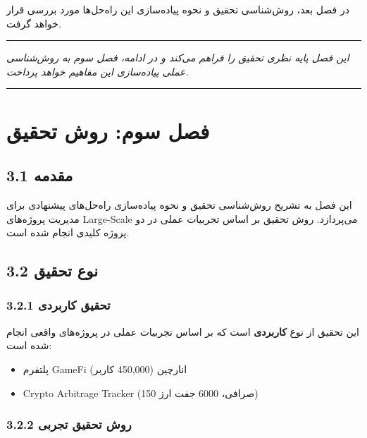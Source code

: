 \documentclass[
]{article}
\providecommand{\tightlist}{%
  \setlength{\itemsep}{0pt}\setlength{\parskip}{0pt}}
\begin{document}
در فصل بعد، روش‌شناسی تحقیق و نحوه پیاده‌سازی این راه‌حل‌ها مورد بررسی قرار
خواهد گرفت.

\begin{center}\rule{0.5\linewidth}{0.5pt}\end{center}

\emph{این فصل پایه نظری تحقیق را فراهم می‌کند و در ادامه، فصل سوم به
روش‌شناسی عملی پیاده‌سازی این مفاهیم خواهد پرداخت.}

\begin{center}\rule{0.5\linewidth}{0.5pt}\end{center}

\section{فصل سوم: روش
تحقیق}\label{ux641ux635ux644-ux633ux648ux645-ux631ux648ux634-ux62aux62dux642ux6ccux642}

\subsection{3.1 مقدمه}\label{ux645ux642ux62fux645ux647-1}

این فصل به تشریح روش‌شناسی تحقیق و نحوه پیاده‌سازی راه‌حل‌های پیشنهادی برای
مدیریت پروژه‌های Large-Scale می‌پردازد. روش تحقیق بر اساس تجربیات عملی در
دو پروژه کلیدی انجام شده است.

\subsection{3.2 نوع
تحقیق}\label{ux646ux648ux639-ux62aux62dux642ux6ccux642}

\subsubsection{3.2.1 تحقیق
کاربردی}\label{ux62aux62dux642ux6ccux642-ux6a9ux627ux631ux628ux631ux62fux6cc}

این تحقیق از نوع \textbf{کاربردی} است که بر اساس تجربیات عملی در
پروژه‌های واقعی انجام شده است:

\begin{itemize}
\tightlist
\item
  پلتفرم GameFi انارچین (450,000 کاربر)
\item
  Crypto Arbitrage Tracker (150 صرافی، 6000 جفت ارز)
\end{itemize}

\subsubsection{3.2.2 روش تحقیق
تجربی}\label{ux631ux648ux634-ux62aux62dux642ux6ccux642-ux62aux62cux631ux628ux6cc}
\end{document}
